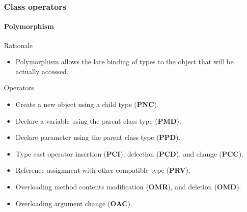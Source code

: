 \begin{frame}
\frametitle{Class operators}
\framesubtitle{Polymorphism}


\begin{block:fact}{Rationale}
\begin{itemize}
	\item Polymorphism allows the late binding of types to the object that will
	be actually accessed.
\end{itemize}
\end{block:fact}

\begin{block:fact}{Operators}
\begin{itemize}
	\item Create a new object using a child type (\textbf{PNC}).
	\item Declare a variable using the parent class type (\textbf{PMD}).
	\item Declare parameter using the parent class type (\textbf{PPD}).
	\item Type cast operator insertion (\textbf{PCI}), delection (\textbf{PCD}),
	and change (\textbf{PCC}).
	\item Reference assignment with other compatible type (\textbf{PRV}).
	\item Overloading method contents modification (\textbf{OMR}), and deletion
	(\textbf{OMD}).
	\item Overloading argument change (\textbf{OAC}).
\end{itemize}
\end{block:fact}
\end{frame}


